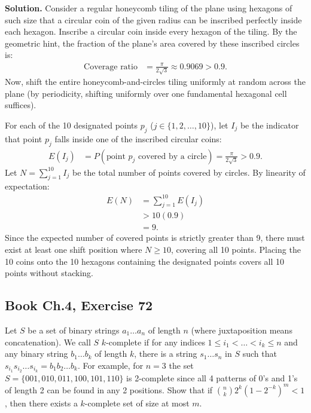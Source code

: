 \documentclass[11pt,a4paper]{article}
\begin{document}
\noindent \textbf{Solution.} Consider a regular honeycomb tiling of the plane using hexagons of such size that a circular coin of the given radius can be inscribed perfectly inside each hexagon. Inscribe a circular coin inside every hexagon of the tiling. By the geometric hint, the fraction of the plane's area covered by these inscribed circles is:
\begin{align*}
\text{Coverage ratio} &= \frac{\pi}{2\sqrt{3}} \approx 0.9069 > 0.9.
\end{align*}
Now, shift the entire honeycomb-and-circles tiling uniformly at random across the plane (by periodicity, shifting uniformly over one fundamental hexagonal cell suffices). 

For each of the 10 designated points $p_j$ ($j \in \{1, 2, \dots, 10\}$), let $I_j$ be the indicator that point $p_j$ falls inside one of the inscribed circular coins:
\begin{align*}
E(I_j) &= P(\text{point } p_j \text{ covered by a circle}) = \frac{\pi}{2\sqrt{3}} > 0.9.
\end{align*}
Let $N = \sum_{j=1}^{10} I_j$ be the total number of points covered by circles. By linearity of expectation:
\begin{align*}
E(N) &= \sum_{j=1}^{10} E(I_j) \\
&> 10 (0.9) \\
&= 9.
\end{align*}
Since the expected number of covered points is strictly greater than 9, there must exist at least one shift position where $N \ge 10$, covering all 10 points. Placing the 10 coins onto the 10 hexagons containing the designated points covers all 10 points without stacking.

\vspace{10pt}
\subsection{Book Ch.4, Exercise 72}
\begin{tcolorbox}[title={Book Ch.4, Exercise 72}]
Let $S$ be a set of binary strings $a_1 \dots a_n$ of length $n$ (where juxtaposition means concatenation). We call $S$ $k$-complete if for any indices $1 \le i_1 < \dots < i_k \le n$ and any binary string $b_1 \dots b_k$ of length $k$, there is a string $s_1 \dots s_n$ in $S$ such that $s_{i_1} s_{i_2} \dots s_{i_k} = b_1 b_2 \dots b_k$. For example, for $n = 3$ the set $S = \{001, 010, 011, 100, 101, 110\}$ is 2-complete since all 4 patterns of 0's and 1's of length 2 can be found in any 2 positions. Show that if $\binom{n}{k} 2^k \left(1 - 2^{-k}\right)^m < 1$, then there exists a $k$-complete set of size at most $m$.
\end{tcolorbox}
\end{document}
